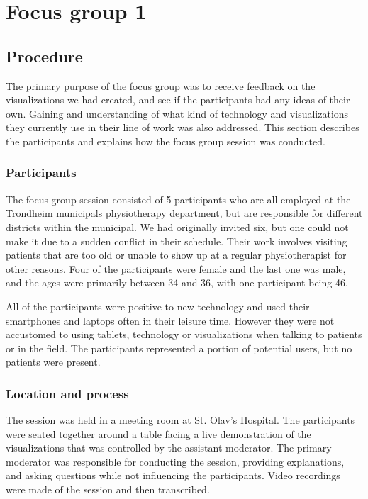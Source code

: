 \chapter{Focus group 1}

\section{Procedure}
The primary purpose of the focus group was to receive feedback on the visualizations we had created, and see if the participants had any ideas of their own. Gaining and understanding of what kind of technology and visualizations they currently use in their line of work was also addressed. This section describes the participants and explains how the focus group session was conducted.

\subsection{Participants}
The focus group session consisted of 5 participants who are all employed at the Trondheim municipals physiotherapy department, but are responsible for different districts within the municipal. We had originally invited six, but one could not make it due to a sudden conflict in their schedule. Their work involves visiting patients that are too old or unable to show up at a regular physiotherapist for other reasons. Four of the participants were female and the last one was male, and the ages were primarily between 34 and 36, with one participant being 46. 

All of the participants were positive to new technology and used their smartphones and laptops often in their leisure time. However they were not accustomed to using tablets, technology or visualizations when talking to patients or in the field. The participants represented a portion of potential users, but no patients were present.

\subsection{Location and process}
The session was held in a meeting room at St. Olav's Hospital. The participants were seated together around a table facing a live demonstration of the visualizations that was controlled by the assistant moderator. The primary moderator was responsible for conducting the session, providing explanations, and asking questions while not influencing the participants. Video recordings were made of the session and then transcribed.

